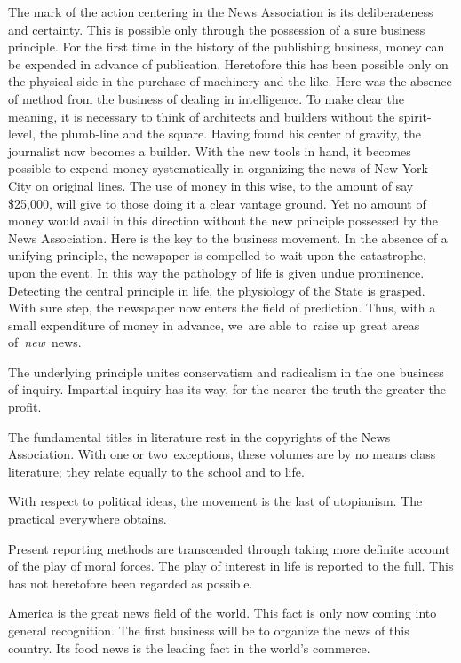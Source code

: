 \documentclass[openany,nobib]{tufte-book}
\begin{document}
The mark of the action centering in the News Association is its
deliberateness and certainty. This is possible only through the
possession of a sure business principle. For the first time in the
history of the publishing business, money can be expended in advance of
publication. Heretofore this has been possible only on the physical side
in the purchase of machinery and the like. Here was the absence of
method from the business of dealing in intelligence. To make clear the
meaning, it is necessary to think of architects and builders without the
spirit-level, the plumb-line and the square. Having found his center of
gravity, the journalist now becomes a builder. With the new tools in
hand, it becomes possible to expend money systematically in organizing
the news of New York City on original lines. The use of money in this
wise, to the amount of say \$25,000, will give to those doing it a clear
vantage ground. Yet no amount of money would avail in this direction
without the new principle possessed by the News Association. Here is the
key to the business movement. In the absence of a unifying principle,
the newspaper is compelled to wait upon the catastrophe, upon the event.
In this way the pathology of life is given undue prominence. Detecting
the central principle in life, the physiology of the State is grasped.
With sure step, the newspaper now enters the field of prediction. Thus,
with a small expenditure of money in advance, we~are able to~raise up
great areas of~\emph{new~}news.~

The underlying principle unites conservatism and radicalism in the one
business of inquiry. Impartial inquiry has its way, for the nearer the
truth the greater the profit.~

The fundamental titles in literature rest in the copyrights of the News
Association. With one or two~exceptions, these volumes are by no means
class literature; they relate equally to the school and to life.~

\enlargethispage{\baselineskip}

With respect to political ideas, the movement is the last of utopianism.
The practical everywhere obtains.~

Present reporting methods are transcended through taking more definite
account of the play of moral forces. The play of interest in life is
reported to the full. This has not heretofore been regarded as
possible.~

America is the great news field of the world. This fact is only now
coming into general recognition. The first business will be to organize
the news of this country. Its food news is the leading fact in the
world's commerce.~
\end{document}
